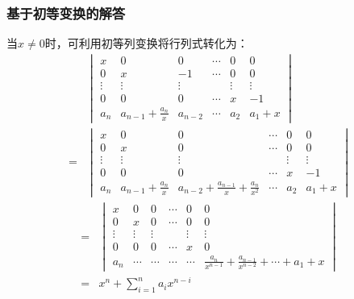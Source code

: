 \documentclass[10pt,xcolor=svgnames]{beamer} %
\begin{document}
\begin{frame}[allowframebreaks]
    \frametitle{基于初等变换的解答}
    当\(x\neq0\)时，可利用初等列变换将行列式转化为：
    \begin{align*}
          &
        \begin{vmatrix}
            x      & 0                     & 0       & \cdots & 0      & 0      \\
            0      & x                     & -1      & \cdots & 0      & 0      \\
            \vdots & \vdots                & \vdots  &        & \vdots & \vdots \\
            0      & 0                     & 0       & \cdots & x      & -1     \\
            a_n    & a_{n-1}+\frac{a_n}{x} & a_{n-2} & \cdots & a_2    & a_1+x
        \end{vmatrix} \\
        = &
        \begin{vmatrix}
            x      & 0                     & 0                                         & \cdots & 0      & 0      \\
            0      & x                     & 0                                         & \cdots & 0      & 0      \\
            \vdots & \vdots                & \vdots                                    &        & \vdots & \vdots \\
            0      & 0                     & 0                                         & \cdots & x      & -1     \\
            a_n    & a_{n-1}+\frac{a_n}{x} & a_{n-2}+\frac{a_{n-1}}{x}+\frac{a_n}{x^2} & \cdots & a_2    & a_1+x
        \end{vmatrix}
    \end{align*}
    \begin{align*}
        = &
        \begin{vmatrix}
            x      & 0      & 0      & \cdots & 0      & 0                                                        \\
            0      & x      & 0      & \cdots & 0      & 0                                                        \\
            \vdots & \vdots & \vdots &        & \vdots & \vdots                                                   \\
            0      & 0      & 0      & \cdots & x      & 0                                                        \\
            a_n    & \cdots & \cdots & \cdots & \cdots & \frac{a_n}{x^{n-1}}+\frac{a_{n-1}}{x^{n-2}}+\cdots+a_1+x
        \end{vmatrix} \\
        = & x^n+\sum_{i=1}^{n}a_ix^{n-i}
    \end{align*}


\end{frame}
\end{document}
